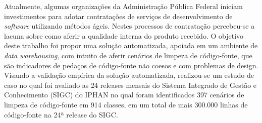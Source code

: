 \begin{resumo}

Atualmente, algumas organizações da Administração Pública Federal iniciam investimentos para adotar contratações de serviços de desenvolvimento de \textit{software} utilizando métodos ágeis. Nestes processos de contratação percebeu-se a lacuna sobre como aferir a qualidade interna do produto recebido. O objetivo deste trabalho foi propor uma solução automatizada, apoiada em um ambiente de \textit{data warehousing}, com intuito de aferir cenários de limpeza de código-fonte, que são indicadores de pedaços de código-fonte não coesos e com problemas de design. Visando a validação empírica da solução automatizada, realizou-se um estudo de caso no qual foi avaliado as 24 releases mensais do Sistema Integrado de Gestão e Conhecimento (SIGC) do IPHAN no qual foram identificados 397 cenários de limpeza de código-fonte em 914 classes, em um total de mais 300.000 linhas de código-fonte na 24ª release do SIGC. 

\end{resumo}
